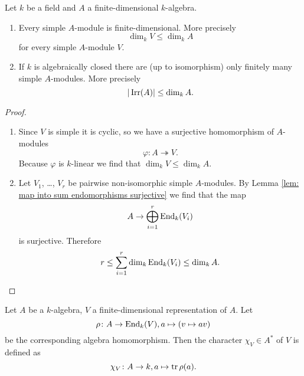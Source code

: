 \begin{prop}\label{prop: simple modules over finite-dimensional algebras}
 Let $k$ be a field and $A$ a finite-dimensional $k$-algebra.
 \begin{enumerate}[label=\emph{\alph*})]
  \item
   Every simple $A$-module is finite-dimensional. More precisely
   \[
    \dim_k V \leq \dim_k A
   \]
   for every simple $A$-module $V$.
  \item
   If $k$ is algebraically closed there are (up to isomorphism) only finitely many simple $A$-modules. More precisely
   \[
    |\operatorname{Irr}(A)| \leq \dim_k A.
   \]
 \end{enumerate}
\end{prop}
\begin{proof}
 \begin{enumerate}[label=\emph{\alph*})]
  \item
   Since $V$ is simple it is cyclic, so we have a surjective homomorphism of $A$-modules
   \[
    \varphi \colon A \twoheadrightarrow V.
   \]
   Because $\varphi$ is $k$-linear we find that $\dim_k V \leq \dim_k A$.
  \item
   Let $V_1$, \dots, $V_r$ be pairwise non-isomorphic simple $A$-modules. By Lemma \ref{lem: map into sum endomorphisms surjective} we find that the map
   \[
    A \to \bigoplus_{i=1}^r \operatorname{End}_k(V_i)
   \]
   is surjective. Therefore
   \[
    r \leq \sum_{i=1}^r \dim_k \operatorname{End}_k(V_i) \leq \dim_k A.
    \qedhere
   \]
 \end{enumerate}
\end{proof}


\begin{defi}
 Let $A$ be a $k$-algebra, $V$ a finite-dimensional representation of $A$. Let
 \[
  \rho \colon A \to \operatorname{End}_k(V), a \mapsto (v \mapsto av)
 \]
 be the corresponding algebra homomorphism. Then the character $\chi_V \in A^*$ of $V$ is defined as
 \[
  \chi_V \colon A \to k, a \mapsto \operatorname{tr} \rho(a).
 \]
\end{defi}



